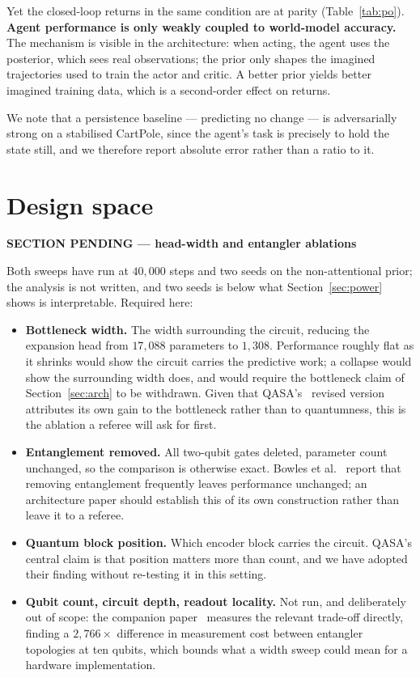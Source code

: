 \documentclass[11pt]{article}
\newif\ifdraft
\newenvironment{pendingbox}[1]
  {\par\vspace{3pt}\noindent
   \begin{lrbox}{\pendbox}\begin{minipage}{0.93\linewidth}\small
   \textcolor{PendFG}{\textbf{SECTION PENDING --- #1}}\par\vspace{3pt}
   \color{PendFG}}
  {\end{minipage}\end{lrbox}%
   \ifdraft\fcolorbox{PendFG}{PendBG}{\usebox{\pendbox}}\fi
   \par\vspace{4pt}}
\begin{document}
Yet the closed-loop returns in the same condition are at parity
(Table~\ref{tab:po}). \textbf{Agent performance is only weakly coupled
to world-model accuracy.} The mechanism is visible in the architecture:
when acting, the agent uses the posterior, which sees real
observations; the prior only shapes the imagined trajectories used to
train the actor and critic. A better prior yields better imagined
training data, which is a second-order effect on returns.

We note that a persistence baseline --- predicting no change --- is
adversarially strong on a stabilised CartPole, since the agent's task is
precisely to hold the state still, and we therefore report absolute
error rather than a ratio to it.

\section{Design space}\label{sec:ablation}
\begin{pendingbox}{head-width and entangler ablations}
Both sweeps have run at $40{,}000$ steps and two seeds on the
non-attentional prior; the analysis is not written, and two seeds is
below what Section~\ref{sec:power} shows is interpretable. Required
here:
\begin{itemize}\itemsep1pt
\item \textbf{Bottleneck width.} The width surrounding the circuit,
      reducing the expansion head from $17{,}088$ parameters to
      $1{,}308$. Performance roughly flat as it shrinks would show the
      circuit carries the predictive work; a collapse would show the
      surrounding width does, and would require the bottleneck claim of
      Section~\ref{sec:arch} to be withdrawn. Given that
      QASA's~\cite{qasa} revised version attributes its own gain to the
      bottleneck rather than to quantumness, this is the ablation a
      referee will ask for first.
\item \textbf{Entanglement removed.} All two-qubit gates deleted,
      parameter count unchanged, so the comparison is otherwise exact.
      Bowles et al.~\cite{bowles2024} report that removing entanglement
      frequently leaves performance unchanged; an architecture paper
      should establish this of its own construction rather than leave it
      to a referee.
\item \textbf{Quantum block position.} Which encoder block carries the
      circuit. QASA's central claim is that position matters more than
      count, and we have adopted their finding without re-testing it in
      this setting.
\item \textbf{Qubit count, circuit depth, readout locality.} Not run,
      and deliberately out of scope: the companion paper~\cite{papera}
      measures the relevant trade-off directly, finding a
      $2{,}766\times$ difference in measurement cost between entangler
      topologies at ten qubits, which bounds what a width sweep could
      mean for a hardware implementation.
\end{itemize}
\end{pendingbox}
\end{document}
